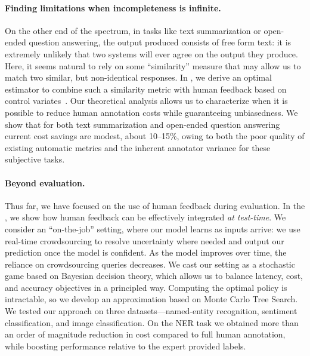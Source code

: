 \paragraph{Finding limitations when incompleteness is infinite.}
On the other end of the spectrum, in tasks like text summarization or open-ended question answering, the output produced consists of free form text: it  is extremely unlikely that two systems will ever agree on the output they produce.
Here, it seems natural to rely on some ``similarity'' measure that may allow us to match two similar, but non-identical responses.
In , we derive an optimal estimator to combine such a similarity metric with human feedback based on control variates~\citep{owen2013monte}.
Our theoretical analysis allows us to characterize when it is possible to reduce human annotation costs while guaranteeing unbiasedness.
We show that for both text summarization and open-ended question answering current cost savings are modest, about 10--15\%, owing to both the poor quality of existing automatic metrics and the inherent annotator variance for these subjective tasks.

\paragraph{Beyond evaluation.}
Thus far, we have focused on the use of human feedback during evaluation.
In the , we show how human feedback can be effectively integrated \textit{at test-time}.
We consider an ``on-the-job'' setting, where our model learns as inputs arrive: we use real-time crowdsourcing to resolve uncertainty where needed and output our prediction once the model is confident.
As the model improves over time, the reliance on crowdsourcing queries decreases. 
We cast our setting as a stochastic game based on Bayesian decision theory, which allows us to balance latency, cost, and accuracy objectives in a principled way. 
Computing the optimal policy is intractable, so we develop an approximation based on Monte Carlo Tree Search.
We tested our approach on three datasets---named-entity recognition, sentiment classification, and image classification.
On the NER task we obtained more than an order of magnitude reduction in cost compared to full human annotation, while boosting performance relative to the expert provided labels.

%






